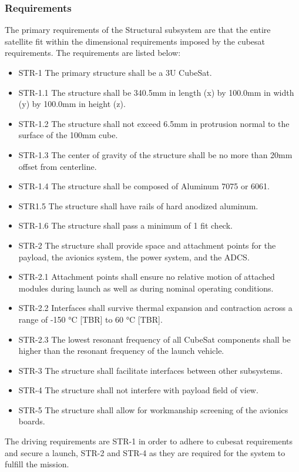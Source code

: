 \documentclass[12pt]{article}
\begin{document}
\subsubsection{Requirements}

The primary requirements of the Structural subsystem are that the entire satellite fit within the dimensional requirements imposed by the cubesat requirements. The requirements are listed below:

\begin{itemize}
\item STR-1 The primary structure shall be a 3U CubeSat.
\item STR-1.1 The structure shall be 340.5mm in length (x) by 100.0mm in width (y) by 100.0mm in height (z).
\item STR-1.2 The structure shall not exceed 6.5mm in protrusion normal to the surface of the 100mm cube.             
\item STR-1.3 The center of gravity of the structure shall be no more than 20mm offset from centerline.
\item STR-1.4 The structure shall be composed of Aluminum 7075 or 6061.
\item STR1.5 The structure shall have rails of hard anodized aluminum.
\item STR-1.6 The structure shall pass a minimum of 1 fit check.
\item STR-2 The structure shall provide space and attachment points for the payload, the avionics system, the power system, and the ADCS.
\item STR-2.1 Attachment points shall ensure no relative motion of attached modules during launch as well as during nominal operating conditions.
\item STR-2.2 Interfaces shall survive thermal expansion and contraction across a range of -150 °C [TBR] to 60 °C [TBR].
\item STR-2.3 The lowest resonant frequency of all CubeSat components shall be higher than the resonant frequency of the launch vehicle.
\item STR-3 The structure shall facilitate interfaces between other subsystems.
\item STR-4 The structure shall not interfere with payload field of view.
\item STR-5 The structure shall allow for workmanship screening of the avionics boards.

\end{itemize}

The driving requirements are STR-1 in order to adhere to cubesat requirements and secure a launch, STR-2 and STR-4 as they are required for the system to fulfill the mission.
\end{document}
